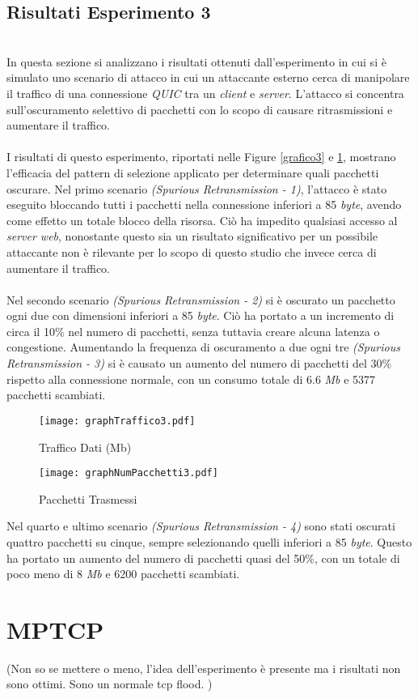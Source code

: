 \subsection{Risultati Esperimento 3}
~\\
\indent In questa sezione si analizzano i risultati ottenuti dall’esperimento in cui si è simulato
uno scenario di attacco in cui un attaccante esterno cerca di manipolare il traffico di una connessione \emph{QUIC} tra un \emph{client} e \emph{server}.
L'attacco si concentra sull'oscuramento selettivo di pacchetti con lo scopo di causare ritrasmissioni e aumentare il traffico.
\\\\
I risultati di questo esperimento, riportati nelle Figure \ref{grafico3} e \ref{grafico32}, mostrano l'efficacia del pattern di selezione applicato per determinare quali pacchetti oscurare. 
Nel primo scenario \emph{(Spurious Retransmission - 1)}, l'attacco è stato eseguito bloccando tutti i pacchetti nella connessione inferiori a 85 \emph{byte}, avendo come effetto un totale blocco della risorsa.
Ciò ha impedito qualsiasi accesso al \emph{server web}, nonostante questo sia un risultato significativo per un possibile attaccante non è rilevante per lo scopo di questo studio che invece cerca di aumentare il traffico.
\\\\
Nel secondo scenario \emph{(Spurious Retransmission - 2)} si è oscurato un pacchetto ogni due con dimensioni inferiori a 85 \emph{byte}. Ciò ha portato a un incremento di circa il 10\% nel numero di pacchetti, senza tuttavia creare alcuna latenza o congestione.
Aumentando la frequenza di oscuramento a due ogni tre \emph{(Spurious Retransmission - 3)} si è causato un aumento del numero di pacchetti del 30\% rispetto alla connessione normale, con un consumo totale di 6.6 \emph{Mb} e 5377 pacchetti scambiati.
\begin{figure}[ht]
    \centering
    \begin{minipage}{0.48\textwidth}
        \centering
        \texttt{[image: graphTraffico3.pdf]}
        \caption{Traffico Dati (Mb)}
        \label{grafico3}
    \end{minipage}
    \hfill
    \begin{minipage}{0.48\textwidth}
        \centering 
        \texttt{[image: graphNumPacchetti3.pdf]}
        \caption{Pacchetti Trasmessi}
        \label{grafico32}
    \end{minipage}
\end{figure}
Nel quarto e ultimo scenario \emph{(Spurious Retransmission - 4)} sono stati oscurati quattro pacchetti su cinque, sempre selezionando quelli inferiori a 85 \emph{byte}.
Questo ha portato un aumento del numero di pacchetti quasi del 50\%, con un totale di poco meno di 8 \emph{Mb} e 6200 pacchetti scambiati. 
\section{MPTCP}

(Non so se mettere o meno, l'idea dell'esperimento è presente ma i risultati non sono ottimi. Sono un normale tcp flood. )
